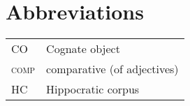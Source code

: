 \documentclass[output=paper,colorlinks,citecolor=brown]{langscibook}
\begin{document}
\section*{Abbreviations}
\begin{tabularx}{.5\textwidth}{@{}lQ@{}}
CO & Cognate object \\
\textsc{comp} & comparative (of adjectives) \\
HC & Hippocratic corpus \\
\end{tabularx}%








\sloppy
\printbibliography[heading=subbibliography,notkeyword=this]
\end{document}
